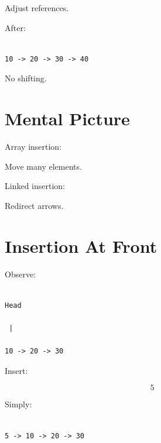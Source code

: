 \documentclass[11pt,a4paper]{book}
\begin{document}
Adjust references.


After:

\begin{verbatim}

10 -> 20 -> 30 -> 40

\end{verbatim}


No shifting.


\section{Mental Picture}

Array insertion:


Move many elements.


Linked insertion:


Redirect arrows.


\section{Insertion At Front}

Observe:

\begin{verbatim}

Head

 |

10 -> 20 -> 30

\end{verbatim}


Insert:

\[
5
\]


Simply:

\begin{verbatim}

5 -> 10 -> 20 -> 30

\end{verbatim}
\end{document}
